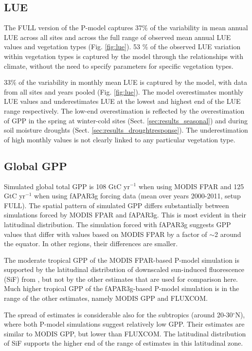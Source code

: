 \documentclass[gmd, manuscript]{copernicus}
\begin{document}
\subsection{LUE}
\label{sec:results_lue}
The FULL version of the P-model captures 37\% of the variability in mean annual LUE across all sites and across the full range of observed mean annual LUE values and vegetation types (Fig. \ref{fig:lue}). 53 \% of the observed LUE variation within vegetation types is captured by the model through the relationships with climate, without the need to specify parameters for specific vegetation types. 

33\% of the variability in monthly mean LUE is captured by the model, with data from all sites and years pooled (Fig. \ref{fig:lue}). The model overestimates monthly LUE values and underestimates LUE at the lowest and highest end of the LUE range respectively. The low-end overestimation is reflected by the overestimation of GPP in the spring at winter-cold sites (Sect. \ref{sec:results_seasonal}) and during soil moisture droughts (Sect. \ref{sec:results_droughtresponse}). The underestimation of high monthly values is not clearly linked to any particular vegetation type.

\subsection{Global GPP}

Simulated global total GPP is 108 GtC yr$^{-1}$ when using MODIS FPAR and 125 GtC yr$^{-1}$ when using fAPAR3g forcing data (mean over years 2000-2011, setup FULL). The spatial pattern of simulated GPP differs substantially between simulations forced by MODIS FPAR and fAPAR3g. This is most evident in their latitudinal distribution. The simulation forced with fAPAR3g suggests GPP values that differ with values based on MODIS FPAR by a factor of $\sim$2 around the equator. In other regions, their differences are smaller.

The moderate tropical GPP of the MODIS FPAR-based P-model simulation is supported by the latitudinal distribution of downscaled sun-induced fluorescence (SiF) from \citet{duveiller19essd}, but not by the other estimates that are used for comparison here. Much higher tropical GPP of the fAPAR3g-based P-model simulation is in the range of the other estimates, namely MODIS GPP and FLUXCOM.

The spread of estimates is considerable also for the subtropics (around 20-30$^{\circ}$N), where both P-model simulations suggest relatively low GPP. Their estimates are similar to MODIS GPP, but lower than FLUXCOM. The latitudinal distribution of SiF supports the higher end of the range of estimates in this latitudinal zone. 
\end{document}
